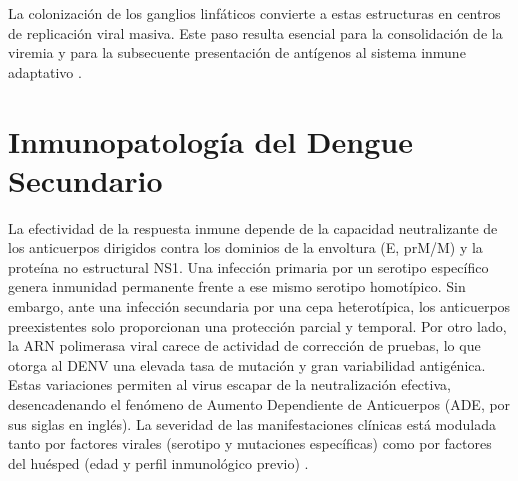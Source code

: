 La colonización de los ganglios linfáticos convierte a estas estructuras en centros de replicación viral masiva. Este paso resulta esencial para la consolidación de la viremia y para la subsecuente presentación de antígenos al sistema inmune adaptativo \cite{st2019adaptive}.

\section{Inmunopatología del Dengue Secundario}
 La efectividad de la respuesta inmune depende de la capacidad neutralizante de los anticuerpos dirigidos contra los dominios de la envoltura (E, prM/M) y la proteína no estructural NS1. Una infección primaria por un serotipo específico genera inmunidad permanente frente a ese mismo serotipo homotípico. Sin embargo, ante una infección secundaria por una cepa heterotípica, los anticuerpos preexistentes solo proporcionan una protección parcial y temporal. Por otro lado, la ARN polimerasa viral carece de actividad de corrección de pruebas, lo que otorga al DENV una elevada tasa de mutación y gran variabilidad antigénica. Estas variaciones permiten al virus escapar de la neutralización efectiva, desencadenando el fenómeno de Aumento Dependiente de Anticuerpos (ADE, por sus siglas en inglés).
La severidad de las manifestaciones clínicas está modulada tanto por factores virales (serotipo y mutaciones específicas) como por factores del huésped (edad y perfil inmunológico previo) \cite{dhole2024host}.

